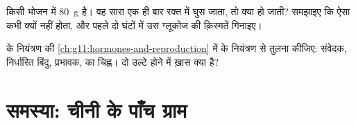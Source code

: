 \begin{exercise}[$\star\star\star$]\label{exo:g12:glucose-and-diabetes:14}
किसी भोजन में \qty{80}{g}  है। वह सारा एक ही बार रक्त में घुस
जाता, तो  क्या हो जाती? समझाइए कि ऐसा कभी क्यों नहीं होता, और
पहले दो घंटों में उस ग्लूकोज की क़िस्मतें गिनाइए।
\end{exercise}

\begin{exercise}[$\star\star\star$]\label{exo:g12:glucose-and-diabetes:15}
 के नियंत्रण की \cref{ch:g11:hormones-and-reproduction} में
 के नियंत्रण से तुलना कीजिए: संवेदक, निर्धारित बिंदु,
प्रभावक,  का चिह्न। दो उल्टे  होने में ख़ास क्या है?
\end{exercise}

\section{समस्या: चीनी के पाँच ग्राम}

